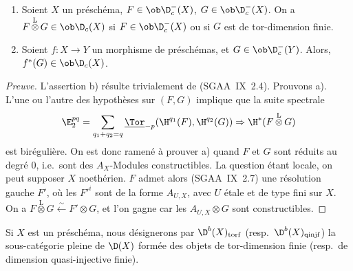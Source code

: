 \begin{lemma}[cf.~{\upshape [H]~II~4.3}]
\begin{enumerate}
\item[a)] Soient $X$ un préschéma, $F \in \ob \D_c^{-}(X)$, $G \in \ob \D_c^{-}(X)$. On a $F \mathop{\otimes}\limits^{\mathrm{L}} G \in \ob \D_c(X)$ si $F \in \ob \D_c^{-}(X)$ ou si $G$ est de tor-dimension finie.
\item[b)] Soient $f : X \to Y$ un morphisme de préschémas, et $G \in \ob \D_c^{-}(Y)$. Alors, $f^{*}(G) \in \ob \D_c(X)$.
\end{enumerate}
\end{lemma}

\begin{proof}[Preuve]
L'assertion b) résulte trivialement de (SGAA~IX~2.4). Prouvons a). L'une ou l'autre des hypothèses sur $(F,G)$ implique que la suite spectrale
\[
\E_2^{pq} = \sum_{q_1+q_2=q} \underline{\Tor}_{-p}(\H^{q_1}(F), \H^{q_2}(G)) \Rightarrow \H^{*}(F \mathop{\otimes}\limits^{\mathrm{L}} G)
\]
est birégulière. On est donc ramené à prouver a) quand $F$ et $G$ sont réduits au degré $0$, i.e.~sont des $A_X$-Modules constructibles. La question étant locale, on peut supposer $X$ noethérien. $F$ admet alors (SGAA~IX~2.7) une résolution gauche $F'$, où les $F'^i$ sont de la forme $A_{U,X}$, avec $U$ étale et de type fini sur $X$. On a $F \mathop{\otimes}\limits^{\mathrm{L}} G \xleftarrow{\sim} F' \otimes G$, et l'on gagne car les $A_{U,X} \otimes G$ sont constructibles.
\end{proof}

\begin{notation}
Si $X$ est un préschéma, nous désignerons par $\D^{b}(X)_{\mathrm{torf}}$ (resp.~$\D^{b}(X)_{\mathrm{qinjf}}$) la sous-catégorie pleine de $\D(X)$ formée des objets de tor-dimension finie (resp.~de dimension quasi-injective finie).
\end{notation}


